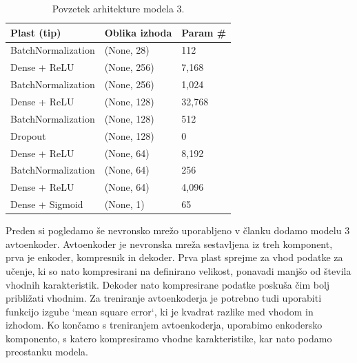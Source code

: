 \documentclass{article}
\begin{document}
\begin{table}[H]
\centering
\begin{tabular}{|l|l|l|}
\hline
\textbf{Plast (tip)}         & \textbf{Oblika izhoda} & \textbf{Param \#} \\
\hline
BatchNormalization           & (None, 28)   & 112     \\
Dense + ReLU                 & (None, 256)  & 7,168   \\
BatchNormalization           & (None, 256)  & 1,024   \\
Dense + ReLU                 & (None, 128)  & 32,768   \\
BatchNormalization           & (None, 128)  & 512   \\
Dropout                      & (None, 128)  & 0       \\
Dense + ReLU                 & (None, 64)   & 8,192  \\
BatchNormalization           & (None, 64)   & 256     \\
Dense + ReLU                 & (None, 64)   & 4,096  \\
Dense + Sigmoid              & (None, 1)    & 65      \\
\hline
\end{tabular}
\caption{Povzetek arhitekture modela 3.}
\label{tab:model3}
\end{table}
Preden si pogledamo še nevronsko mrežo uporabljeno v članku \cite{Baldi:2014kfa} dodamo modelu 3 avtoenkoder. Avtoenkoder je nevronska mreža sestavljena iz treh komponent, prva je enkoder, kompresnik in dekoder. Prva plast sprejme za vhod podatke za učenje, ki so nato kompresirani na definirano velikost, ponavadi manjšo od števila vhodnih karakteristik. Dekoder nato kompresirane podatke poskuša čim bolj približati vhodnim. Za treniranje avtoenkoderja je potrebno tudi uporabiti funkcijo izgube `mean square error`, ki je kvadrat razlike med vhodom in izhodom. Ko končamo s treniranjem avtoenkoderja, uporabimo enkodersko komponento, s katero kompresiramo vhodne karakteristike, kar nato podamo preostanku modela.
\end{document}

